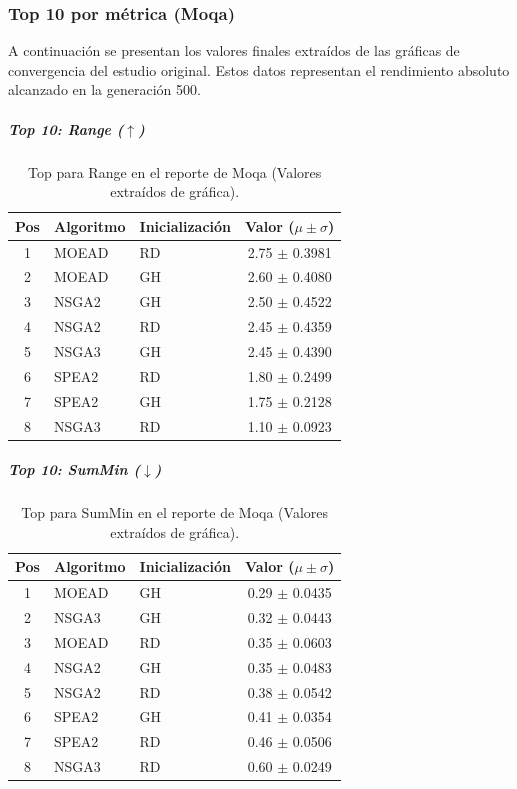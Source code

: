 \documentclass[a4paper,10pt]{article}
\begin{document}
\subsubsection{Top 10 por métrica (Moqa)}
A continuación se presentan los valores finales extraídos de las gráficas de convergencia del estudio original. Estos datos representan el rendimiento absoluto alcanzado en la generación 500.

\subparagraph{Top 10: Range ($\uparrow$)}
\begin{table}[H]
    \centering
    \begin{tabular}{cllc}
        \toprule
        Pos & Algoritmo & Inicialización & Valor ($\mu \pm \sigma$) \\
        \midrule
        1 & MOEAD & RD & 2.75 $\pm$ 0.3981 \\
        2 & MOEAD & GH & 2.60 $\pm$ 0.4080 \\
        3 & NSGA2 & GH & 2.50 $\pm$ 0.4522 \\
        4 & NSGA2 & RD & 2.45 $\pm$ 0.4359 \\
        5 & NSGA3 & GH & 2.45 $\pm$ 0.4390 \\
        6 & SPEA2 & RD & 1.80 $\pm$ 0.2499 \\
        7 & SPEA2 & GH & 1.75 $\pm$ 0.2128 \\
        8 & NSGA3 & RD & 1.10 $\pm$ 0.0923 \\
        \bottomrule
    \end{tabular}
    \caption{Top para Range en el reporte de Moqa (Valores extraídos de gráfica).}
\end{table}

\subparagraph{Top 10: SumMin ($\downarrow$)}
\begin{table}[H]
    \centering
    \begin{tabular}{cllc}
        \toprule
        Pos & Algoritmo & Inicialización & Valor ($\mu \pm \sigma$) \\
        \midrule
        1 & MOEAD & GH & 0.29 $\pm$ 0.0435 \\
        2 & NSGA3 & GH & 0.32 $\pm$ 0.0443 \\
        3 & MOEAD & RD & 0.35 $\pm$ 0.0603 \\
        4 & NSGA2 & GH & 0.35 $\pm$ 0.0483 \\
        5 & NSGA2 & RD & 0.38 $\pm$ 0.0542 \\
        6 & SPEA2 & GH & 0.41 $\pm$ 0.0354 \\
        7 & SPEA2 & RD & 0.46 $\pm$ 0.0506 \\
        8 & NSGA3 & RD & 0.60 $\pm$ 0.0249 \\
        \bottomrule
    \end{tabular}
    \caption{Top para SumMin en el reporte de Moqa (Valores extraídos de gráfica).}
\end{table}
\end{document}
